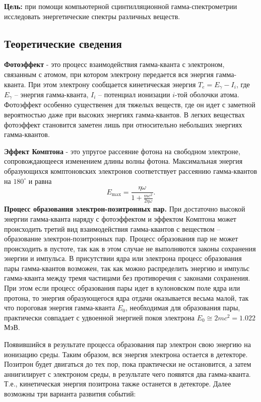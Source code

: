 \documentclass[12pt,a4paper]{article}
\begin{document}
     \textbf{Цель:} при помощи компьютерной сцинтилляционной гамма-спектрометрии исследовать энергетические спектры различных веществ.


\subsection{Теоретические сведения}

\textbf{Фотоэффект} - это процесс взаимодействия гамма-кванта с электроном, связанным с атомом, при котором электрону передается вся энергия гамма-кванта. При этом электрону сообщается кинетическая энергия $T_e=E_\gamma-I_i$, где $E_\gamma$ -- энергия гамма-кванта, $I_i$ -- потенциал ионизации $i$-той оболочки атома. Фотоэффект особенно существенен для тяжелых веществ, где он идет с заметной вероятностью даже при высоких энергиях гамма-квантов. В легких веществах фотоэффект становится заметен лишь при относительно небольших энергиях гамма-квантов.  \par
\textbf{Эффект Комптона} - это упругое рассеяние фотона на свободном электроне, сопровождающееся изменением длины волны фотона. Максимальная энергия образующихся комптоновских электронов соответствует рассеянию гамма-квантов на $180^\circ$ и равна
\begin{equation}
E_{\max}=\frac{\eta\omega}{1+\frac{mc^2}{2\eta\omega}}.
\end{equation}
\textbf{Процесс образования электрон-позитронных пар.}
При достаточно высокой энергии гамма-кванта наряду с фотоэффектом и эффектом Комптона может происходить третий вид взаимодействия гамма-квантов с веществом -- образование электрон-позитронных пар. Процесс образования пар не может происходить в пустоте, так как в этом случае не выполняются законы сохранения энергии и импульса. В присутствии ядра или электрона процесс образования пары гамма-квантов возможен, так как можно распределить энергию и импульс гамма-кванта между тремя частицами без противоречия с законами сохранения. При этом если процесс образования пары идет в кулоновском поле ядра или протона, то энергия образующегося ядра отдачи оказывается весьма малой, так что пороговая энергия гамма-кванта $E_0$, необходимая для образования пары, практически совпадает с удвоенной энергией покоя электрона $E_0\cong 2mc^2=1.022$ МэВ.\par
Появившийся в результате процесса образования пар электрон свою энергию на ионизацию среды. Таким образом, вся энергия электрона остается в детекторе. Позитрон будет двигаться до тех пор, пока практически не остановится, а затем аннигилирует с электроном среды, в результате чего появятся два гамма-кванта. Т.е., кинетическая энергия позитрона также останется в детекторе. Далее возможны три варианта развития событий:
\end{document}
